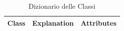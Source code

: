 \begin{longtable}{l|l|l} 
\caption{Dizionario delle Classi}
\\
Class    & Explanation                                                                                                                                                & Attributes                                                                                                                                                                                                                                                                                                                                                                                                                                                                                                                                                                                                                                                                                                                                                                                                                                                                                                                                                                                                                                                                                                                                                                                                                                                                                                                     \\ 
\hline

\end{longtable}
